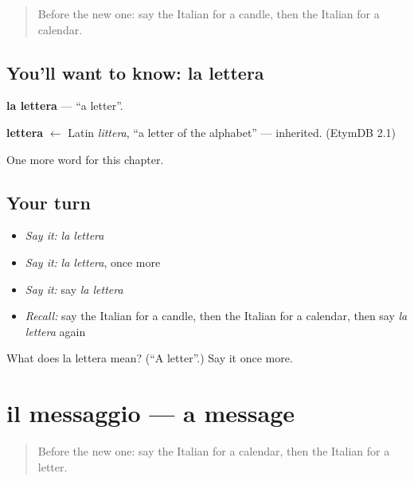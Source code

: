 \label{lesson:IT-C101-lettera}



\begin{quote}
Before the new one: say the Italian for a candle, then the Italian for a calendar.
\end{quote}

\subsection*{You'll want to know: la lettera}
\textbf{la lettera} — \textquotedblleft{}a letter\textquotedblright{}.

\begin{cousinweb}
\textbf{lettera} $\leftarrow$ Latin \emph{littera}, \textquotedblleft{}a letter of the alphabet\textquotedblright{} — inherited. (EtymDB 2.1)
\end{cousinweb}

\begin{grammarlens}[title={What you've built}]
One more word for this chapter.
\end{grammarlens}

\subsection*{Your turn}
\begin{itemize}
\raggedright
  \item \emph{Say it:} \emph{la lettera}
  \item \emph{Say it:} \emph{la lettera}, once more
  \item \emph{Say it:} say \emph{la lettera}
  \item \emph{Recall:} say the Italian for a candle, then the Italian for a calendar, then say \emph{la lettera} again
\end{itemize}

\begin{tcolorbox}[breakable,colback=teal!4,colframe=teal!35!black,title={Before you move on}]
What does la lettera mean? (\textquotedblleft{}A letter\textquotedblright{}.) Say it once more.
\end{tcolorbox}
\section[il messaggio]{il messaggio — a message}

\label{lesson:IT-C101-messaggio}



\begin{quote}
Before the new one: say the Italian for a calendar, then the Italian for a letter.
\end{quote}

